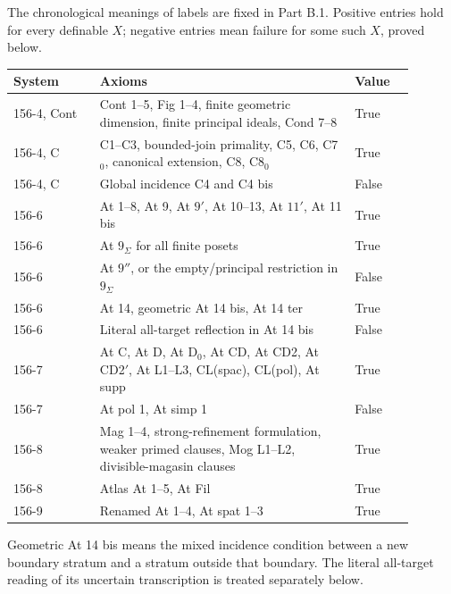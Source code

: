 \begin{theorem}\label{SA21-BM-cell-axioms}
The chronological meanings of labels are fixed in Part B.1.
Positive entries hold for every definable \(X\); negative
entries mean failure for some such \(X\), proved below.
\begin{center}
\begin{tabular}{p{0.19\linewidth}p{0.57\linewidth}p{0.13\linewidth}}
\hline
System & Axioms & Value\\ \hline
156-4, Cont & Cont 1--5, Fig 1--4, finite geometric dimension,
finite principal ideals, Cond 7--8 & True\\
156-4, C & C1--C3, bounded-join primality, C5, C6,
C7\(_0\), canonical extension, C8, C8\(_0\) & True\\
156-4, C & Global incidence C4 and C4 bis & False\\
156-6 & At 1--8, At 9, At \(9'\), At 10--13,
At \(11'\), At 11 bis & True\\
156-6 & At \(9_\Sigma\) for all finite posets & True\\
156-6 & At \(9''\), or the empty/principal restriction
in \(9_\Sigma\) & False\\
156-6 & At 14, geometric At 14 bis, At 14 ter & True\\
156-6 & Literal all-target reflection in At 14 bis & False\\
156-7 & At C, At D, At D\(_0\), At CD, At CD2,
At CD2\( '\), At L1--L3, CL(spac), CL(pol), At supp & True\\
156-7 & At pol 1, At simp 1 & False\\
156-8 & Mag 1--4, strong-refinement formulation,
weaker primed clauses, Mog L1--L2, divisible-magasin clauses & True\\
156-8 & Atlas At 1--5, At Fil & True\\
156-9 & Renamed At 1--4, At spat 1--3 & True\\ \hline
\end{tabular}
\end{center}
Geometric At 14 bis means the mixed incidence condition
between a new boundary stratum and a stratum outside
that boundary. The literal all-target reading of its
uncertain transcription is treated separately below.
\end{theorem}

